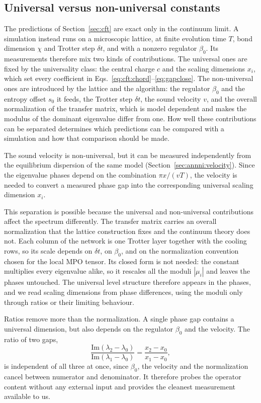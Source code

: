 \subsection{Universal versus non-universal constants}
\label{sec:numerics:universal}

The predictions of Section~\ref{sec:cft} are exact only in the continuum limit. A simulation instead runs on a microscopic lattice, at finite evolution time $T$, bond dimension $\chi$ and Trotter step $\delta t$, and with a nonzero regulator $\beta_0$. Its measurements therefore mix two kinds of contributions. The universal ones are fixed by the universality class: the central charge $c$ and the scaling dimensions $x_i$, which set every coefficient in Eqs.~\eqref{eq:cft:chord}--\eqref{eq:gapclose}. The non-universal ones are introduced by the lattice and the algorithm: the regulator $\beta_0$ and the entropy offset $s_0$ it feeds, the Trotter step $\delta t$, the sound velocity $v$, and the overall normalization of the transfer matrix, which is model dependent and makes the modulus of the dominant eigenvalue differ from one. How well these contributions can be separated determines which predictions can be compared with a simulation and how that comparison should be made.

The sound velocity is non-universal, but it can be measured independently from the equilibrium dispersion of the same model (Section~\ref{sec:annni:velocity}). Since the eigenvalue phases depend on the combination $\pi x/(vT)$, the velocity is needed to convert a measured phase gap into the corresponding universal scaling dimension $x_i$.

This separation is possible because the universal and non-universal contributions affect the spectrum differently. The transfer matrix carries an overall normalization that the lattice construction fixes and the continuum theory does not. Each column of the network is one Trotter layer together with the cooling rows, so its scale depends on $\delta t$, on $\beta_0$, and on the normalization convention chosen for the local \ac{MPO} tensor. Its closed form is not needed: the constant multiplies every eigenvalue alike, so it rescales all the moduli $|\mu_i|$ and leaves the phases untouched. The universal level structure therefore appears in the phases, and we read scaling dimensions from phase differences, using the moduli only through ratios or their limiting behaviour.

Ratios remove more than the normalization. A single phase gap contains a universal dimension, but also depends on the regulator $\beta_0$ and the velocity. The ratio of two gaps,
\begin{equation}
    \frac{\mathrm{Im}(\lambda_2-\lambda_0)}{\mathrm{Im}(\lambda_1-\lambda_0)}
      = \frac{x_2-x_0}{x_1-x_0},
    \label{eq:cft:gapratio}
\end{equation}
is independent of all three at once, since $\beta_0$, the velocity and the normalization cancel between numerator and denominator. It therefore probes the operator content without any external input and provides the cleanest measurement available to us.

